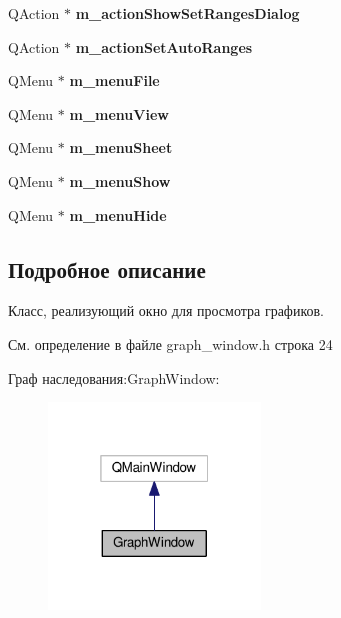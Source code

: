 \begin{DoxyCompactItemize}
\item 
Q\+Action $\ast$ {\bfseries m\+\_\+action\+Show\+Set\+Ranges\+Dialog}\hypertarget{class_graph_window_a6c342da9e826998d3744ec87d5a710a4}{}\label{class_graph_window_a6c342da9e826998d3744ec87d5a710a4}

\item 
Q\+Action $\ast$ {\bfseries m\+\_\+action\+Set\+Auto\+Ranges}\hypertarget{class_graph_window_add86d9623399b3aaace9c961c2c56d9f}{}\label{class_graph_window_add86d9623399b3aaace9c961c2c56d9f}

\item 
Q\+Menu $\ast$ {\bfseries m\+\_\+menu\+File}\hypertarget{class_graph_window_a2cfe856a0c10dfffb05e4a568d135feb}{}\label{class_graph_window_a2cfe856a0c10dfffb05e4a568d135feb}

\item 
Q\+Menu $\ast$ {\bfseries m\+\_\+menu\+View}\hypertarget{class_graph_window_a3e2ffe57452e156a0d62fb82da8ed868}{}\label{class_graph_window_a3e2ffe57452e156a0d62fb82da8ed868}

\item 
Q\+Menu $\ast$ {\bfseries m\+\_\+menu\+Sheet}\hypertarget{class_graph_window_ae3c17a4c2fc6e3f935dc3b3f7cc89974}{}\label{class_graph_window_ae3c17a4c2fc6e3f935dc3b3f7cc89974}

\item 
Q\+Menu $\ast$ {\bfseries m\+\_\+menu\+Show}\hypertarget{class_graph_window_a4078c2f892ffb57912412fb0c38af5ba}{}\label{class_graph_window_a4078c2f892ffb57912412fb0c38af5ba}

\item 
Q\+Menu $\ast$ {\bfseries m\+\_\+menu\+Hide}\hypertarget{class_graph_window_a2df057f6b70c12d9190a456a7f62b9c4}{}\label{class_graph_window_a2df057f6b70c12d9190a456a7f62b9c4}

\end{DoxyCompactItemize}


\subsection{Подробное описание}
Класс, реализующий окно для просмотра графиков. 

См. определение в файле graph\+\_\+window.\+h строка 24



Граф наследования\+:Graph\+Window\+:
\nopagebreak
\begin{figure}[H]
\begin{center}
\leavevmode
\includegraphics[width=160pt]{class_graph_window__inherit__graph}
\end{center}
\end{figure}


